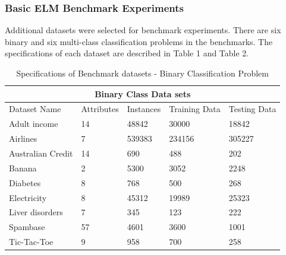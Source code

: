\documentclass[a4paper, 14pt]{extarticle}
\begin{document}
\subsubsection{Basic ELM Benchmark Experiments}
Additional datasets were selected for benchmark experiments. There are six binary and six multi-class classification problems in the benchmarks. The specifications of each dataset are described in Table 1 and Table 2. \newline\newline
\begin{table}[H]
\caption{Specifications of Benchmark datasets - Binary Classification Problem}
\label{tab:binarydatasets}
\centering
\begin{tabular}{ |p{3cm}||p{2.5cm}|p{2.5cm}|p{2.5cm}|p{2.5cm}|  }
 \hline
 \multicolumn{5}{|c|}{Binary Class Data sets} \\
 \hline
 Dataset Name& Attributes & Instances &  Training Data & Testing Data\\
 \hline
  Adult income& 14  & 48842 &30000&   18842\\
 \hline
 Airlines   & 7    & 539383 & 234156 &   305227\\
  \hline
 Australian Credit&   14  & 690   & 488 &   202\\
  \hline
 Banana & 2 & 5300 &  3052&  2248\\
   \hline
 Diabetes &   8 & 768 & 500 &   268 \\
  \hline
 Electricity &   8 & 45312 &19989&   25323\\
  \hline
 Liver disorders& 7  & 345 &123&   222\\
  \hline
  Spambase & 57  & 4601 &3600&1001\\ 
 \hline
   Tic-Tac-Toe & 9  & 958 &700&258\\ 
 \hline
\end{tabular}
\end{table}
\end{document}

